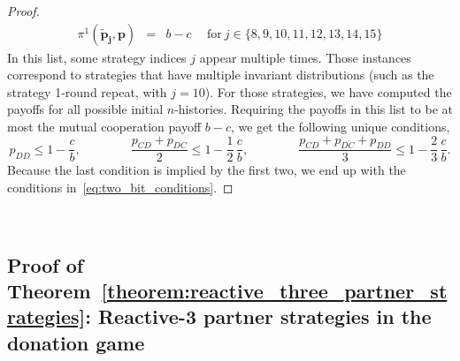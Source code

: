 \documentclass[9pt,twoside,lineno]{pnas-new}
\theoremstyle{plainCl1}
\theoremstyle{plainCl2}
\begin{document}
\begin{proof}
\begin{equation*}
\begin{array}{lcll}
   \pi^1(\mathbf{\tilde p_j},\mathbf{p}) &= &\displaystyle  b - c & ~~\text{for}~ j\! \in\!  \{8, 9, 10, 11, 12, 13, 14, 15\}
  \end{array}
\end{equation*}
In this list, some strategy indices $j$ appear multiple times. 
Those instances correspond to strategies that have multiple invariant distributions (such as the strategy 1-round repeat, with $j\!=\!10$). For those strategies, we have computed the payoffs for all possible initial $n$-histories.  
Requiring the payoffs in this list to be at most the mutual cooperation payoff $b\! -\! c$, we get the following unique conditions,
\begin{equation*}
 p_{DD}  \le 1 \!-\! \frac{c}{b}, \qquad \qquad
\frac{p_{CD} + p_{DC}}{2}  \le 1\! -\! \frac{1}{2} \,  \frac{c}{b}, \qquad \qquad
 \frac{p_{CD} + p_{DC} + p_{DD}}{3} \le	 1 \!-\! \frac{2}{3} \, \frac{c}{b}.
\end{equation*}
Because the last condition is implied by the first two, we end up with the conditions in~\eqref{eq:two_bit_conditions}. 
\end{proof}
~



\subsection{Proof of Theorem~\ref{theorem:reactive_three_partner_strategies}: Reactive-3 partner strategies in the donation game}
\end{document}
